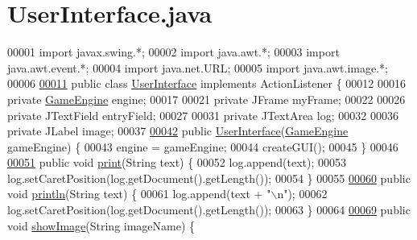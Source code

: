 \hypertarget{UserInterface_8java_source}{\section{User\-Interface.\-java}
}

\begin{DoxyCode}
00001 \textcolor{keyword}{import} javax.swing.*;
00002 \textcolor{keyword}{import} java.awt.*;
00003 \textcolor{keyword}{import} java.awt.event.*;
00004 \textcolor{keyword}{import} java.net.URL;
00005 \textcolor{keyword}{import} java.awt.image.*;
00006 
\hypertarget{UserInterface_8java_source_l00011}{}\hyperlink{classUserInterface}{00011} \textcolor{keyword}{public} \textcolor{keyword}{class }\hyperlink{classUserInterface}{UserInterface} \textcolor{keyword}{implements} ActionListener \{
00012 
00016     \textcolor{keyword}{private} \hyperlink{classGameEngine}{GameEngine} engine;
00017 
00021     \textcolor{keyword}{private} JFrame myFrame;
00022 
00026     \textcolor{keyword}{private} JTextField entryField;
00027 
00031     \textcolor{keyword}{private} JTextArea log;
00032 
00036     \textcolor{keyword}{private} JLabel image;
00037 
\hypertarget{UserInterface_8java_source_l00042}{}\hyperlink{classUserInterface_a3afe416f3ee335fec8bc815d382c3874}{00042}     \textcolor{keyword}{public} \hyperlink{classUserInterface_a3afe416f3ee335fec8bc815d382c3874}{UserInterface}(\hyperlink{classGameEngine}{GameEngine} gameEngine) \{
00043         engine = gameEngine;
00044         createGUI();
00045     \}
00046 
\hypertarget{UserInterface_8java_source_l00051}{}\hyperlink{classUserInterface_a7a0de5ce2b0e0d25ba6573e87c63c1de}{00051}     \textcolor{keyword}{public} \textcolor{keywordtype}{void} \hyperlink{classUserInterface_a7a0de5ce2b0e0d25ba6573e87c63c1de}{print}(String text) \{
00052         log.append(text);
00053         log.setCaretPosition(log.getDocument().getLength());
00054     \}
00055 
\hypertarget{UserInterface_8java_source_l00060}{}\hyperlink{classUserInterface_a79f606b4b1f5d1523e50eea00039ed94}{00060}     \textcolor{keyword}{public} \textcolor{keywordtype}{void} \hyperlink{classUserInterface_a79f606b4b1f5d1523e50eea00039ed94}{println}(String text) \{
00061         log.append(text + \textcolor{stringliteral}{"\(\backslash\)n"});
00062         log.setCaretPosition(log.getDocument().getLength());
00063     \}
00064 
\hypertarget{UserInterface_8java_source_l00069}{}\hyperlink{classUserInterface_ab793a0f12878c698ba3e1720a9f86f3b}{00069}     \textcolor{keyword}{public} \textcolor{keywordtype}{void} \hyperlink{classUserInterface_ab793a0f12878c698ba3e1720a9f86f3b}{showImage}(String imageName) \{

\end{DoxyCode}

